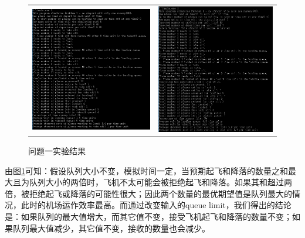 \documentclass[12pt,UTF8]{ctexart}
\begin{document}
\begin{spacing}{1.4}
\begin{figure}[H]
	\centering
	\begin{tabular}{cc}
	\includegraphics[width=0.5\linewidth]{fig/exp_10.PNG} &
	\includegraphics[width=0.5\linewidth]{fig/exp_11.PNG}
	\end{tabular}
	\caption{问题一实验结果}
	\label{fig:1}
\end{figure}
由图\ref{fig:1}可知：假设队列大小不变，模拟时间一定，当预期起飞和降落的数量之和最大且为队列大小的两倍时，飞机不太可能会被拒绝起飞和降落。如果其和超过两倍，被拒绝起飞或降落的可能性很大；因此两个数量的最优期望值是队列最大的情况，此时的机场运作效率最高。而通过改变输入的$\text{queue limit}$，我们得出的结论是：如果队列的最大值增大，而其它值不变，接受飞机起飞和降落的数量不变；如果队列最大值减少，其它值不变，接收的数量也会减少。


\end{spacing}
\end{document}
